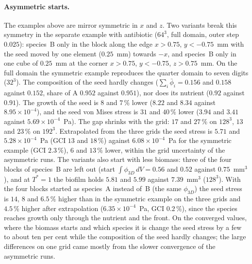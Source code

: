 \documentclass[11pt,a4paper]{article}
\newcommand{\phiD}{\phi_{3D}}
\newcommand{\lv}{\textstyle\sum_i\bar\phi_i}
\begin{document}
\paragraph{Asymmetric starts.} The examples above are mirror symmetric in $x$ and $z$. Two variants break this symmetry in the separate example with antibiotic ($64^3$, full domain, outer step $0.025$): species~B only in the block along the edge $x>0.75$, $y<-0.75$~mm with the seed moved by one element ($0.25$~mm) towards $-x$, and species~B only in one cube of $0.25$~mm at the corner $x>0.75$, $y<-0.75$, $z>0.75$~mm. On the full domain the symmetric example reproduces the quarter domain to seven digits ($32^3$). The composition of the seed hardly changes ($\lv=0.156$ and $0.158$ against $0.152$, share of A $0.952$ against $0.951$), nor does its nutrient ($0.92$ against $0.91$). The growth of the seed is $8$ and $7\,\%$ lower ($8.22$ and $8.34$ against $8.95\times10^{-4}$), and the seed von Mises stress is $31$ and $40\,\%$ lower ($3.94$ and $3.41$ against $5.69\times10^{-4}$~Pa). The gap shrinks with the grid: $17$ and $27\,\%$ on $128^3$, $13$ and $23\,\%$ on $192^3$. Extrapolated from the three grids the seed stress is $5.71$ and $5.28\times10^{-4}$~Pa (GCI $13$ and $18\,\%$) against $6.08\times10^{-4}$~Pa for the symmetric example (GCI $2.3\,\%$), $6$ and $13\,\%$ lower, within the grid uncertainty of the asymmetric runs. The variants also start with less biomass: three of the four blocks of species~B are left out (start $\int\phiD\,dV=0.56$ and $0.52$ against $0.75$~mm$^3$), and at $T^*=1$ the biofilm holds $5.81$ and $5.99$ against $7.39$~mm$^3$ ($128^3$). With the four blocks started as species~A instead of~B (the same $\phiD$) the seed stress is $14$, $8$ and $6.5\,\%$ higher than in the symmetric example on the three grids and $4.5\,\%$ higher after extrapolation ($6.35\times10^{-4}$~Pa, GCI $0.2\,\%$), since the species reaches growth only through the nutrient and the front. On the converged values, where the biomass starts and which species it is change the seed stress by a few to about ten per cent while the composition of the seed hardly changes; the large differences on one grid came mostly from the slower convergence of the asymmetric runs.
\end{document}
